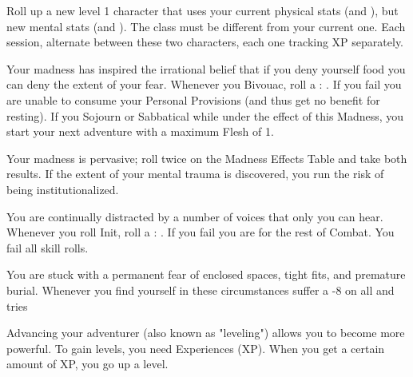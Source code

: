 {  

  Roll up a new level 1 character that uses your current physical stats (\VIG and \DEX), but new mental stats (\INT and \FOC). The class must be different from your current one. Each session, alternate between these two characters, each one tracking XP separately.


  Your madness has inspired the irrational belief that if you deny yourself food you can deny the extent of your fear. Whenever you Bivouac, roll a \RS : \FOC.  If you fail you are unable to consume your Personal Provisions (and thus get no benefit for resting).  If you Sojourn or Sabbatical while under the effect of this Madness, you start your next adventure with a maximum Flesh of 1.



  Your madness is pervasive; roll twice on the Madness Effects Table and take both results. If the extent of your mental trauma is discovered, you run the risk of being institutionalized.


  You are continually distracted by a number of voices that only you can hear. Whenever you roll Init, roll a \RS : \FOC.  If you fail you are  for the rest of Combat. You fail all  skill rolls.


  You are stuck with a permanent fear of enclosed spaces, tight fits, and premature burial. Whenever you find yourself in these circumstances suffer a -8 on all \RO and \RB tries


  \newpage


  Advancing your adventurer (also known as "leveling") allows you to become more powerful.  To gain levels, you need Experiences (XP).  When you get a certain amount of XP, you go up a level.



}
